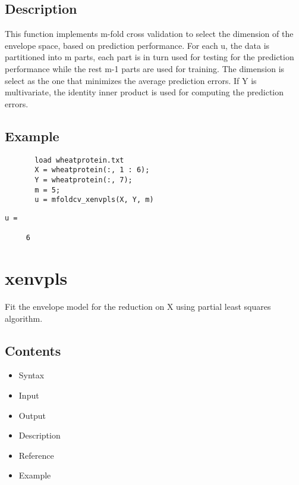 \documentclass[a4paper,11pt,openany]{memoir}
\begin{document}
\subsection*{Description}

\begin{par}
This function implements m-fold cross validation to select the dimension of the envelope space, based on prediction performance.  For each u, the data is partitioned into m parts, each part is in turn used for testing for the prediction performance while the rest m-1 parts are used for training.  The dimension is select as the one that minimizes the average prediction errors. If Y is multivariate, the identity inner product is used for computing the prediction errors.
\end{par} \vspace{1em}


\subsection*{Example}


\begin{verbatim}       load wheatprotein.txt
       X = wheatprotein(:, 1 : 6);
       Y = wheatprotein(:, 7);
       m = 5;
       u = mfoldcv_xenvpls(X, Y, m)\end{verbatim}
    
        \color{lightgray} \ttfamily\begin{verbatim}
u =

     6

\end{verbatim} \rmfamily\color{black}

\newpage

\rmfamily
\color{black}\section{xenvpls}

\begin{par}
Fit the envelope model for the reduction on X using partial least squares algorithm.
\end{par} \vspace{1em}

\subsection*{Contents}

\begin{itemize}
\setlength{\itemsep}{-1ex}
   \item Syntax
   \item Input
   \item Output
   \item Description
   \item Reference
   \item Example
\end{itemize}
\end{document}
